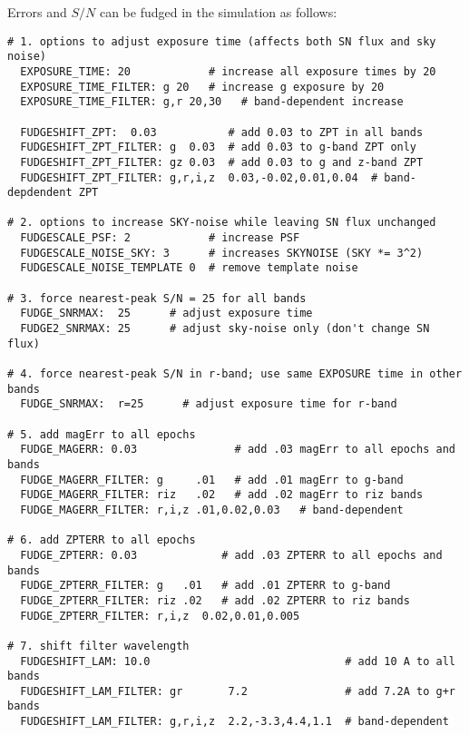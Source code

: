 \documentclass[12pt]{article}
\begin{document}
\newcommand{\FSNMAX}{\hat{F}_{\rm SN}}

Errors and $S/N$ can be fudged in the simulation  as follows:
%
\begin{Verbatim}[frame=single]
# 1. options to adjust exposure time (affects both SN flux and sky noise)
  EXPOSURE_TIME: 20            # increase all exposure times by 20
  EXPOSURE_TIME_FILTER: g 20   # increase g exposure by 20
  EXPOSURE_TIME_FILTER: g,r 20,30   # band-dependent increase

  FUDGESHIFT_ZPT:  0.03           # add 0.03 to ZPT in all bands
  FUDGESHIFT_ZPT_FILTER: g  0.03  # add 0.03 to g-band ZPT only
  FUDGESHIFT_ZPT_FILTER: gz 0.03  # add 0.03 to g and z-band ZPT
  FUDGESHIFT_ZPT_FILTER: g,r,i,z  0.03,-0.02,0.01,0.04  # band-depdendent ZPT

# 2. options to increase SKY-noise while leaving SN flux unchanged
  FUDGESCALE_PSF: 2            # increase PSF
  FUDGESCALE_NOISE_SKY: 3      # increases SKYNOISE (SKY *= 3^2)
  FUDGESCALE_NOISE_TEMPLATE 0  # remove template noise

# 3. force nearest-peak S/N = 25 for all bands 
  FUDGE_SNRMAX:  25      # adjust exposure time
  FUDGE2_SNRMAX: 25      # adjust sky-noise only (don't change SN flux)

# 4. force nearest-peak S/N in r-band; use same EXPOSURE time in other bands
  FUDGE_SNRMAX:  r=25      # adjust exposure time for r-band

# 5. add magErr to all epochs
  FUDGE_MAGERR: 0.03               # add .03 magErr to all epochs and bands
  FUDGE_MAGERR_FILTER: g     .01   # add .01 magErr to g-band 
  FUDGE_MAGERR_FILTER: riz   .02   # add .02 magErr to riz bands
  FUDGE_MAGERR_FILTER: r,i,z .01,0.02,0.03   # band-dependent

# 6. add ZPTERR to all epochs
  FUDGE_ZPTERR: 0.03             # add .03 ZPTERR to all epochs and bands
  FUDGE_ZPTERR_FILTER: g   .01   # add .01 ZPTERR to g-band 
  FUDGE_ZPTERR_FILTER: riz .02   # add .02 ZPTERR to riz bands
  FUDGE_ZPTERR_FILTER: r,i,z  0.02,0.01,0.005 

# 7. shift filter wavelength 
  FUDGESHIFT_LAM: 10.0                              # add 10 A to all bands
  FUDGESHIFT_LAM_FILTER: gr       7.2               # add 7.2A to g+r bands
  FUDGESHIFT_LAM_FILTER: g,r,i,z  2.2,-3.3,4.4,1.1  # band-dependent
\end{Verbatim}
%
\end{document}

